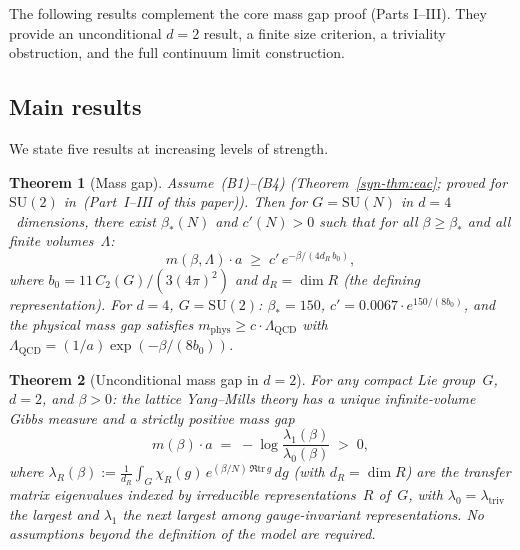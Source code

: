 \documentclass[11pt]{article}
\newtheorem{theorem}{Theorem}[section]
\theoremstyle{definition}
\newcommand{\SU}{\mathrm{SU}}
\newcommand{\tr}{\mathrm{tr}}
\begin{document}
\medskip

The following results complement the core mass gap proof (Parts I--III).
They provide an unconditional $d=2$ result, a finite size criterion,
a triviality obstruction, and the full continuum limit construction.

\subsection{Main results}

We state five results at increasing levels of strength.

\begin{theorem}[Mass gap]\label{syn-thm:conditional}
Assume~\textup{(B1)--(B4)} \textup{(Theorem~\ref{syn-thm:eac};
proved for $\SU(2)$ in~(Part~I--III of this paper))}.
Then for $G = \SU(N)$ in $d = 4$~dimensions, there
exist $\beta_*(N)$ and $c'(N) > 0$ such that for all
$\beta \geq \beta_*$ and all finite volumes~$\Lambda$:
\begin{equation}\label{syn-eq:conditional_gap}
  m(\beta, \Lambda) \cdot a
  \;\geq\; c'\,e^{-\beta/(4d_R\,b_0)},
\end{equation}
where $b_0 = 11\,C_2(G)/(3(4\pi)^2)$ and $d_R = \dim R$
(the defining representation).
For $d = 4$, $G = \SU(2)$: $\beta_* = 150$,
$c' = 0.0067\cdot e^{150/(8b_0)}$,
and the physical mass gap satisfies
$m_{\mathrm{phys}} \geq c\cdot\Lambda_{\mathrm{QCD}}$
with $\Lambda_{\mathrm{QCD}} = (1/a)\exp(-\beta/(8b_0))$.
\end{theorem}

\begin{theorem}[Unconditional mass gap in $d = 2$]
\label{syn-thm:d2}
For any compact Lie group~$G$, $d = 2$, and $\beta > 0$:
the lattice Yang--Mills theory has a unique infinite-volume
Gibbs measure and a strictly positive mass gap
\begin{equation}\label{syn-eq:d2_gap}
  m(\beta) \cdot a
  \;=\; -\log\frac{\lambda_1(\beta)}{\lambda_0(\beta)}
  \;>\; 0,
\end{equation}
where $\lambda_R(\beta) :=
\frac{1}{d_R}\int_G \chi_R(g)\,e^{(\beta/N)\,\Re\tr\,g}\,dg$
(with $d_R = \dim R$)
are the transfer matrix eigenvalues indexed by irreducible
representations~$R$ of~$G$, with $\lambda_0 = \lambda_{\mathrm{triv}}$
the largest and $\lambda_1$ the next largest among
gauge-invariant representations.
No assumptions beyond the definition of the model are
required.\end{theorem}
\end{document}

